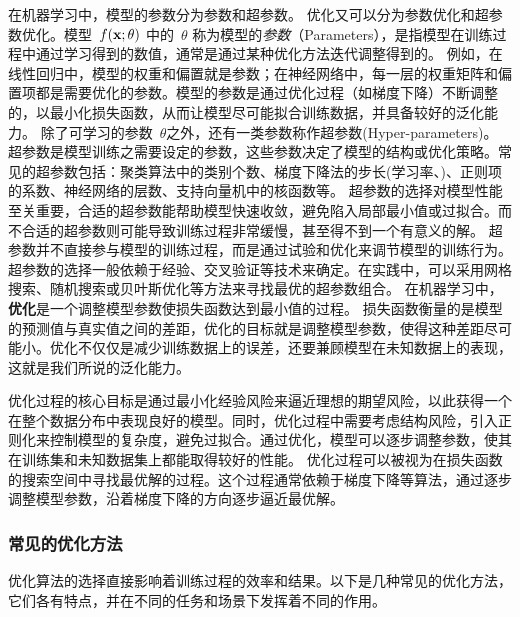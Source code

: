 在机器学习中，模型的参数分为参数和超参数。
优化又可以分为参数优化和超参数优化。模型~$f ({\bf x}; \theta)$ 中的~$\theta$ 称为模型的{\em 参数}（Parameters），是指模型在训练过程中通过学习得到的数值，通常是通过某种优化方法迭代调整得到的。
例如，在线性回归中，模型的权重和偏置就是参数；在神经网络中，每一层的权重矩阵和偏置项都是需要优化的参数。模型的参数是通过优化过程（如梯度下降）不断调整的，以最小化损失函数，从而让模型尽可能拟合训练数据，并具备较好的泛化能力。
除了可学习的参数~$\theta$之外，还有一类参数称作超参数(Hyper-parameters)。
超参数是模型训练之需要设定的参数，这些参数决定了模型的结构或优化策略。常见的超参数包括：聚类算法中的类别个数、梯度下降法的步长(学习率、)、正则项的系数、神经网络的层数、支持向量机中的核函数等。
超参数的选择对模型性能至关重要，合适的超参数能帮助模型快速收敛，避免陷入局部最小值或过拟合。而不合适的超参数则可能导致训练过程非常缓慢，甚至得不到一个有意义的解。
超参数并不直接参与模型的训练过程，而是通过试验和优化来调节模型的训练行为。
超参数的选择一般依赖于经验、交叉验证等技术来确定。在实践中，可以采用网格搜索、随机搜索或贝叶斯优化等方法来寻找最优的超参数组合。
在机器学习中，{\bf 优化}是一个调整模型参数使损失函数达到最小值的过程。
损失函数衡量的是模型的预测值与真实值之间的差距，优化的目标就是调整模型参数，使得这种差距尽可能小。优化不仅仅是减少训练数据上的误差，还要兼顾模型在未知数据上的表现，这就是我们所说的泛化能力。

优化过程的核心目标是通过最小化经验风险来逼近理想的期望风险，以此获得一个在整个数据分布中表现良好的模型。同时，优化过程中需要考虑结构风险，引入正则化来控制模型的复杂度，避免过拟合。通过优化，模型可以逐步调整参数，使其在训练集和未知数据集上都能取得较好的性能。
优化过程可以被视为在损失函数的搜索空间中寻找最优解的过程。这个过程通常依赖于梯度下降等算法，通过逐步调整模型参数，沿着梯度下降的方向逐步逼近最优解。

\subsubsection{ 常见的优化方法}
优化算法的选择直接影响着训练过程的效率和结果。以下是几种常见的优化方法，它们各有特点，并在不同的任务和场景下发挥着不同的作用。


